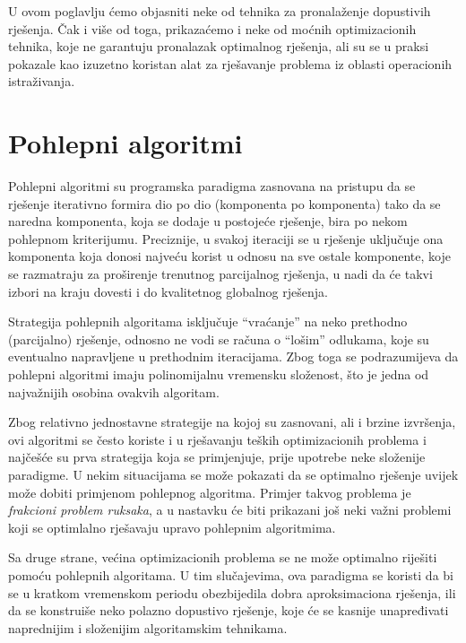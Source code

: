 \documentclass[a4paper, utf8, 11pt, colorlinks]{book}
\theoremstyle{definition}
\begin{document}
 U ovom poglavlju ćemo objasniti neke od tehnika za pronalaženje dopustivih rješenja. Čak i više od toga, prikazaćemo i neke od moćnih optimizacionih tehnika, koje ne garantuju  pronalazak optimalnog rješenja, ali su se u praksi pokazale kao izuzetno koristan alat za rješavanje problema iz oblasti operacionih istraživanja.
 

\section{Pohlepni algoritmi}
 
Pohlepni algoritmi su programska paradigma zasnovana na pristupu da se  rješenje iterativno formira dio po dio (komponenta po komponenta) tako da se naredna komponenta, koja se dodaje u postojeće rješenje, bira 
 po nekom pohlepnom kriterijumu. Preciznije, u svakoj iteraciji se u rješenje uključuje ona komponenta koja donosi najveću korist u odnosu na sve ostale komponente, koje se razmatraju za proširenje  trenutnog parcijalnog rješenja, u nadi da će takvi izbori na kraju dovesti i do kvalitetnog globalnog rješenja.
 
 
 Strategija pohlepnih algoritama isključuje ``vraćanje'' na neko prethodno (parcijalno) rješenje, odnosno ne vodi se računa o ``lošim'' odlukama, koje su eventualno napravljene u prethodnim iteracijama. Zbog toga se podrazumijeva da pohlepni algoritmi imaju polinomijalnu vremensku složenost, što je jedna od najvažnijih osobina ovakvih algoritam.
 
 Zbog relativno jednostavne strategije na kojoj su zasnovani, ali i brzine izvršenja, ovi algoritmi se često koriste i u rješavanju teških optimizacionih problema i najčešće su prva strategija koja se primjenjuje, prije 
upotrebe neke složenije paradigme. 
U nekim situacijama se može pokazati da se optimalno rješenje uvijek može dobiti primjenom pohlepnog algoritma. Primjer takvog problema je \emph{frakcioni problem ruksaka}, a u nastavku će biti prikazani još neki važni problemi koji se optimlalno rješavaju upravo pohlepnim algoritmima.
 
Sa druge strane, većina optimizacionih problema se ne može optimalno riješiti pomoću pohlepnih algoritama. U tim slučajevima, ova paradigma se koristi da bi se u kratkom vremenskom periodu obezbijedila dobra aproksimaciona rješenja, ili da se konstruiše neko polazno dopustivo rješenje, koje će se kasnije unapređivati naprednijim i složenijim algoritamskim tehnikama. 
\end{document}
